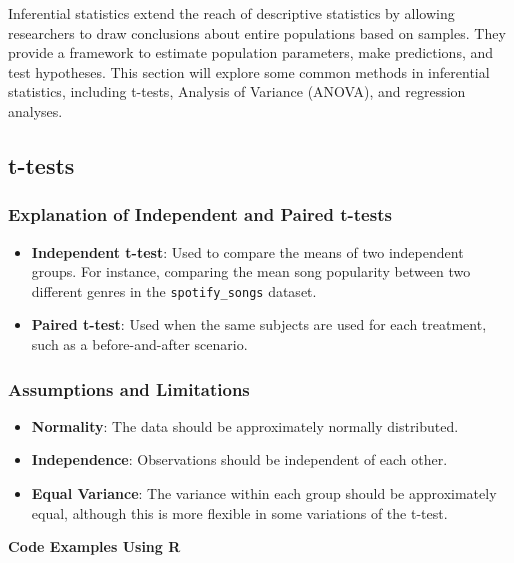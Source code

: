 \documentclass[
  b5paper]{book}
\providecommand{\tightlist}{%
  \setlength{\itemsep}{0pt}\setlength{\parskip}{0pt}}
\begin{document}
Inferential statistics extend the reach of descriptive statistics by allowing researchers to draw conclusions about entire populations based on samples. They provide a framework to estimate population parameters, make predictions, and test hypotheses. This section will explore some common methods in inferential statistics, including t-tests, Analysis of Variance (ANOVA), and regression analyses.

\hypertarget{t-tests}{%
\subsection{t-tests}\label{t-tests}}

\hypertarget{explanation-of-independent-and-paired-t-tests}{%
\subsubsection{Explanation of Independent and Paired t-tests}\label{explanation-of-independent-and-paired-t-tests}}

\begin{itemize}
\item
  \textbf{Independent t-test}: Used to compare the means of two independent groups. For instance, comparing the mean song popularity between two different genres in the \texttt{spotify\_songs} dataset.
\item
  \textbf{Paired t-test}: Used when the same subjects are used for each treatment, such as a before-and-after scenario.
\end{itemize}

\hypertarget{assumptions-and-limitations}{%
\subsubsection{Assumptions and Limitations}\label{assumptions-and-limitations}}

\begin{itemize}
\tightlist
\item
  \textbf{Normality}: The data should be approximately normally distributed.
\item
  \textbf{Independence}: Observations should be independent of each other.
\item
  \textbf{Equal Variance}: The variance within each group should be approximately equal, although this is more flexible in some variations of the t-test.
\end{itemize}

\textbf{Code Examples Using R}
\end{document}
